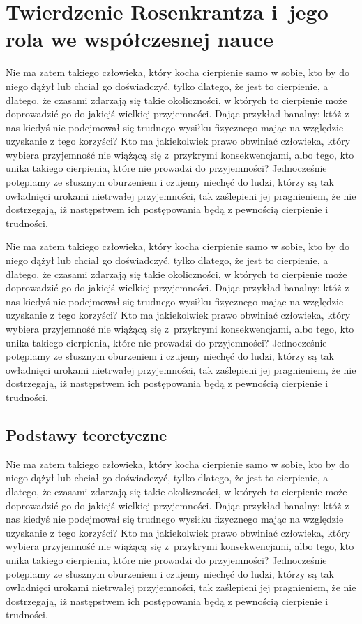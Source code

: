 \documentclass[12pt]{mwbk}
\theoremstyle{plain}
\theoremstyle{definition}
\theoremstyle{remark}
\begin{document}
\chapter{Twierdzenie Rosenkrantza i~jego rola we współczesnej nauce}

Nie ma zatem takiego człowieka, który kocha cierpienie samo w sobie, 
kto by do niego dążył lub chciał go doświadczyć, tylko dlatego, że
jest to cierpienie, a dlatego, że czasami zdarzają się takie 
okoliczności, w których to cierpienie może doprowadzić 
go do jakiejś wielkiej przyjemności. 
Dając przykład banalny: któż z nas kiedyś nie podejmował 
się trudnego wysiłku fizycznego mając na względzie 
uzyskanie z tego korzyści? 
Kto ma jakiekolwiek prawo obwiniać człowieka, 
który wybiera przyjemność nie wiążącą się z~przykrymi 
konsekwencjami, albo tego, kto unika takiego cierpienia, 
które nie prowadzi do przyjemności? 
Jednocześnie potępiamy ze słusznym oburzeniem i czujemy 
niechęć do ludzi, którzy są tak owładnięci urokami nietrwałej 
przyjemności, tak zaślepieni jej pragnieniem, 
że nie dostrzegają, iż następstwem ich 
postępowania będą z pewnością cierpienie i trudności.





Nie ma zatem takiego człowieka, który kocha cierpienie samo w sobie, 
kto by do niego dążył lub chciał go doświadczyć, tylko dlatego, że
jest to cierpienie, a dlatego, że czasami zdarzają się takie 
okoliczności, w których to cierpienie może doprowadzić 
go do jakiejś wielkiej przyjemności. 
Dając przykład banalny: któż z nas kiedyś nie podejmował 
się trudnego wysiłku fizycznego mając na względzie 
uzyskanie z tego korzyści? 
Kto ma jakiekolwiek prawo obwiniać człowieka, 
który wybiera przyjemność nie wiążącą się z~przykrymi 
konsekwencjami, albo tego, kto unika takiego cierpienia, 
które nie prowadzi do przyjemności? 
Jednocześnie potępiamy ze słusznym oburzeniem i czujemy 
niechęć do ludzi, którzy są tak owładnięci urokami nietrwałej 
przyjemności, tak zaślepieni jej pragnieniem, 
że nie dostrzegają, iż następstwem ich 
postępowania będą z pewnością cierpienie i trudności.

\section{Podstawy teoretyczne}
Nie ma zatem takiego człowieka, który kocha cierpienie samo w sobie, 
kto by do niego dążył lub chciał go doświadczyć, tylko dlatego, że
jest to cierpienie, a dlatego, że czasami zdarzają się takie 
okoliczności, w których to cierpienie może doprowadzić 
go do jakiejś wielkiej przyjemności. 
Dając przykład banalny: któż z nas kiedyś nie podejmował 
się trudnego wysiłku fizycznego mając na względzie 
uzyskanie z tego korzyści? 
Kto ma jakiekolwiek prawo obwiniać człowieka, 
który wybiera przyjemność nie wiążącą się z~przykrymi 
konsekwencjami, albo tego, kto unika takiego cierpienia, 
które nie prowadzi do przyjemności? 
Jednocześnie potępiamy ze słusznym oburzeniem i czujemy 
niechęć do ludzi, którzy są tak owładnięci urokami nietrwałej 
przyjemności, tak zaślepieni jej pragnieniem, 
że nie dostrzegają, iż następstwem ich 
postępowania będą z pewnością cierpienie i trudności.
\end{document}
